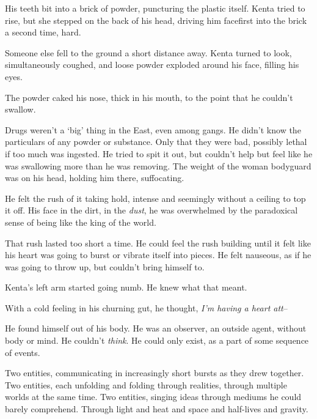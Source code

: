 His teeth bit into a brick of powder, puncturing the plastic itself.  Kenta tried to rise, but she stepped on the back of his head, driving him facefirst into the brick a second time, hard.



Someone else fell to the ground a short distance away.  Kenta turned to look, simultaneously coughed, and loose powder exploded around his face, filling his eyes.



The powder caked his nose, thick in his mouth, to the point that he couldn't swallow.



Drugs weren't a `big' thing in the East, even among gangs.  He didn't know the particulars of any powder or substance.  Only that they were bad, possibly lethal if too much was ingested.  He tried to spit it out, but couldn't help but feel like he was swallowing more than he was removing.  The weight of the woman bodyguard was on his head, holding him there, suffocating.



He felt the rush of it taking hold, intense and seemingly without a ceiling to top it off.  His face in the dirt, in the \emph{dust}, he was overwhelmed by the paradoxical sense of being like the king of the world.



That rush lasted too short a time.  He could feel the rush building until it felt like his heart was going to burst or vibrate itself into pieces.  He felt nauseous, as if he was going to throw up, but couldn't bring himself to.



Kenta's left arm started going numb.  He knew what that meant.



With a cold feeling in his churning gut, he thought, \emph{I'm having a heart att}–



He found himself out of his body.  He was an observer, an outside agent, without body or mind.  He couldn't \emph{think}.  He could only exist, as a part of some sequence of events.



Two entities, communicating in increasingly short bursts as they drew together.  Two entities, each unfolding and folding through realities, through multiple worlds at the same time.  Two entities, singing ideas through mediums he could barely comprehend.  Through light and heat and space and half-lives and gravity.



